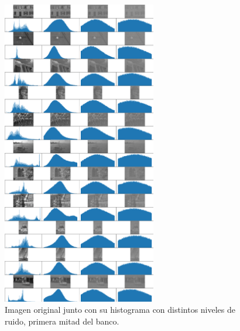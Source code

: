 \begin{figure}
    \centering
    \includegraphics[width=0.6\textwidth]{figuras/img_hist_noise_1.png}
    \caption{Imagen original junto con su histograma con distintos niveles de ruido, primera mitad del banco.}
\end{figure}

